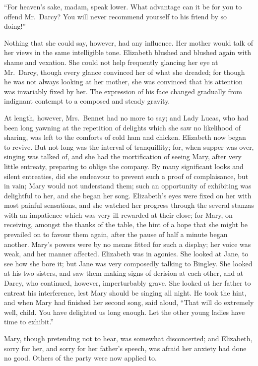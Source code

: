 \documentclass[12pt,english]{book}
\begin{document}
{}``For heaven's sake, madam, speak lower. What advantage can it
be for you to offend Mr.\ Darcy? You will never recommend yourself
to his friend by so doing!''\ 

Nothing that she could say, however, had any influence. Her mother
would talk of her views in the same intelligible tone. Elizabeth blushed
and blushed again with shame and vexation. She could not help frequently
glancing her eye at Mr.\ Darcy, though every glance convinced her
of what she dreaded; for though he was not always looking at her mother,
she was convinced that his attention was invariably fixed by her.
The expression of his face changed gradually from indignant contempt
to a composed and steady gravity.

At length, however, Mrs.\ Bennet had no more to say; and Lady Lucas,
who had been long yawning at the repetition of delights which she
saw no likelihood of sharing, was left to the comforts of cold ham
and chicken. Elizabeth now began to revive. But not long was the interval
of tranquillity; for, when supper was over, singing was talked of,
and she had the mortification of seeing Mary, after very little entreaty,
preparing to oblige the company. By many significant looks and silent
entreaties, did she endeavour to prevent such a proof of complaisance,
but in vain; Mary would not understand them; such an opportunity of
exhibiting was delightful to her, and she began her song. Elizabeth's
eyes were fixed on her with most painful sensations, and she watched
her progress through the several stanzas with an impatience which
was very ill rewarded at their close; for Mary, on receiving, amongst
the thanks of the table, the hint of a hope that she might be prevailed
on to favour them again, after the pause of half a minute began another.
Mary's powers were by no means fitted for such a display; her voice
was weak, and her manner affected. Elizabeth was in agonies. She looked
at Jane, to see how she bore it; but Jane was very composedly talking
to Bingley. She looked at his two sisters, and saw them making signs
of derision at each other, and at Darcy, who continued, however, imperturbably
grave. She looked at her father to entreat his interference, lest
Mary should be singing all night. He took the hint, and when Mary
had finished her second song, said aloud, {}``That will do extremely
well, child. You have delighted us long enough. Let the other young
ladies have time to exhibit.''

Mary, though pretending not to hear, was somewhat disconcerted; and
Elizabeth, sorry for her, and sorry for her father's speech, was afraid
her anxiety had done no good. Others of the party were now applied
to.
\end{document}

